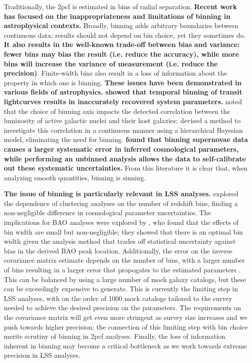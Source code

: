 \documentclass[modern]{aastex62}
\newcommand{\cf}{2pcf\xspace}
\newcommand{\new}[1]{\textbf{#1}}
\begin{document}
Traditionally, the \cf is estimated in bins of radial separation.
\new{Recent work has focused on the inappropriateness and limitations of binning in astrophysical contexts.}
Broadly, binning adds arbitrary boundaries between continuous data; results should not depend on bin choice, yet they sometimes do.
\new{It also results in the well-known trade-off between bias and variance: fewer bins may bias the result (i.e. reduce the accuracy), while more bins will increase the variance of measurement (i.e. reduce the precision)}.
Finite-width bins also result in a loss of information about the property in which one is binning.
\new{These issues have been demonstrated in various fields of astrophysics.}
\new{\cite{Kipping2010} showed that temporal binning of transit lightcurves results in inaccurately recovered system parameters.}
\cite{Lanzuisi2017} noted that the choice of binning axis impacts the detected correlation between the luminosity of active galactic nuclei and their host galaxies; \cite{Grimmett2020} devised a method to investigate this correlation in a continuous manner using a hierarchical Bayesian model, eliminating the need for binning.
\new{\cite{Brout2020} found that binning supernovae data causes a larger systematic error in inferred cosmological parameters, while performing an unbinned analysis allows the data to self-calibrate out these systematic uncertainties.}
From this literature it is clear that, when analyzing smooth quantities, binning is sinning.

\new{The issue of binning is particularly relevant in LSS analyses.}
\cite{Bailoni2016} explored the dependence of clustering analyses on the number of redshift bins, finding a non-negligible difference in cosmological parameter uncertainties.
The implications for BAO analyses were explored by \cite{Percival2014}, who found that the effects of bin width are small but non-negligible; they showed that there is an optimal bin width given the analysis method that trades off statistical uncertainty against bias in the derived BAO peak location.
Additionally, the error on the inverse covariance matrix estimate depends on the number of bins, with a larger number of bins resulting in a larger error that propogates to the estimated parameters \citep{Hartlap2007, Percival2014}.
This can be balanced by using a large number of mock galaxy catalogs, but these can be exceedingly expensive to generate.
This is currently the limiting step in LSS analyses, with on the order of 1000 mock catalogs tailored to the survey needed to achieve the desired precision on the parameters.
The requirements on the covariance matrix will get even more stringent as survey size increases and we push towards higher precision; the connection of this limiting step with bin choice merits scrutiny of binning in \cf analyses.
Finally, the loss of information inherent in binning may become a critical bottleneck as we work towards extreme precision in LSS analyses.
\end{document}
